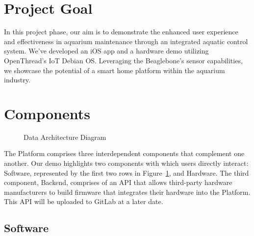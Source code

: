 \documentclass[8pt,twocolumn]{article}
\begin{document}
\section{Project Goal}

In this project phase, our aim is to demonstrate the enhanced user experience and effectiveness in aquarium maintenance through an integrated aquatic control system. We've developed an iOS app and a hardware demo utilizing OpenThread's IoT Debian OS. Leveraging the Beaglebone's sensor capabilities, we showcase the potential of a smart home platform within the aquarium industry.

\section{Components}

\begin{figure}[!htbp]
    \centering
    \caption{Data Architecture Diagram \label{fig:architecture_diagram}}
\end{figure}

The Platform comprises three interdependent components that complement one another. Our demo highlights two components with which users directly interact: Software, represented by the first two rows in Figure~\ref{fig:architecture_diagram}, and Hardware. The third component, Backend, comprises of an API that allows third-party hardware manufacturers to build firmware that integrates their hardware into the Platform. This API will be uploaded to GitLab \cite{codebase} at a later date.

\subsection{Software}
\end{document}
